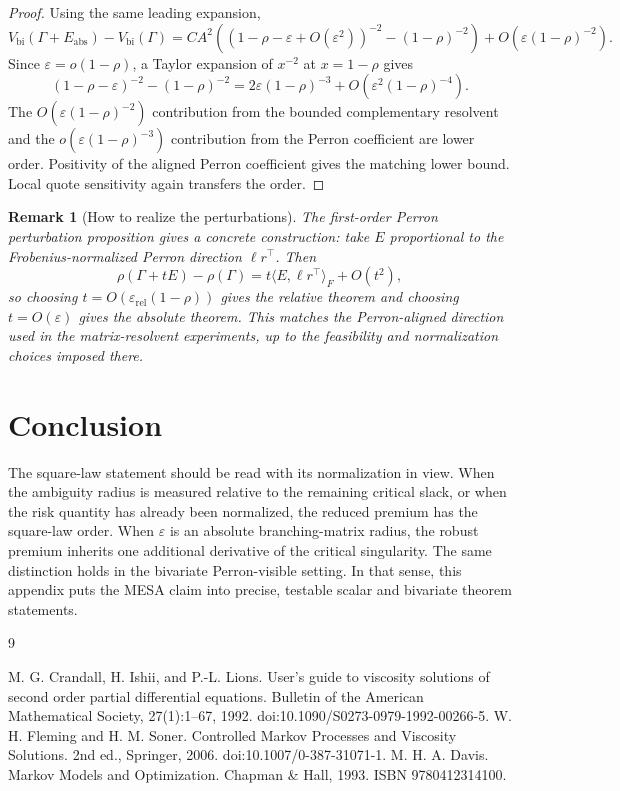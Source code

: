 \documentclass[11pt]{article}
\newtheorem{remark}[assumption]{Remark}
\newcommand{\eps}{\varepsilon}
\begin{document}
\begin{proof}
Using the same leading expansion,
\[
V_{\mathrm{bi}}(\Gamma+\!E_{\mathrm{abs}})-V_{\mathrm{bi}}(\Gamma)
=
C A^2\left((1-\rho-\eps+O(\eps^2))^{-2}
-(1-\rho)^{-2}\right)
+O(\eps(1-\rho)^{-2}).
\]
Since $\eps=o(1-\rho)$, a Taylor expansion of $x^{-2}$ at $x=1-\rho$ gives
\[
(1-\rho-\eps)^{-2}-(1-\rho)^{-2}
=
2\eps(1-\rho)^{-3}+O(\eps^2(1-\rho)^{-4}).
\]
The $O(\eps(1-\rho)^{-2})$ contribution from the bounded complementary resolvent
and the $o(\eps(1-\rho)^{-3})$ contribution from the Perron coefficient are
lower order. Positivity of the aligned Perron coefficient gives the matching
lower bound. Local quote sensitivity again transfers the order.
\end{proof}

\begin{remark}[How to realize the perturbations]
The first-order Perron perturbation proposition gives a concrete construction:
take $E$ proportional to the Frobenius-normalized Perron direction
$\ell r^\top$. Then
\[
\rho(\Gamma+tE)-\rho(\Gamma)=t\langle E,\ell r^\top\rangle_F+O(t^2),
\]
so choosing $t=O(\eps_{\mathrm{rel}}(1-\rho))$ gives the relative theorem and
choosing $t=O(\eps)$ gives the absolute theorem. This matches the
Perron-aligned direction used in the matrix-resolvent experiments, up to the
feasibility and normalization choices imposed there.
\end{remark}

\section{Conclusion}

The square-law statement should be read with its normalization in view. When
the ambiguity radius is measured relative to the remaining critical slack, or
when the risk quantity has already been normalized, the reduced premium has the
square-law order. When $\eps$ is an absolute branching-matrix radius, the robust
premium inherits one additional derivative of the critical singularity. The same
distinction holds in the bivariate Perron-visible setting. In that sense, this
appendix puts the MESA claim into precise, testable scalar and bivariate theorem
statements.

\begin{thebibliography}{9}
\raggedright
{} M. G. Crandall, H. Ishii, and P.-L. Lions.
User's guide to viscosity solutions of second order partial differential
equations. Bulletin of the American Mathematical Society, 27(1):1--67, 1992.
doi:10.1090/S0273-0979-1992-00266-5.
 W. H. Fleming and H. M. Soner. Controlled Markov
Processes and Viscosity Solutions. 2nd ed., Springer, 2006.
doi:10.1007/0-387-31071-1.
 M. H. A. Davis. Markov Models and Optimization. Chapman
\& Hall, 1993. ISBN 9780412314100.
\end{thebibliography}
\end{document}
